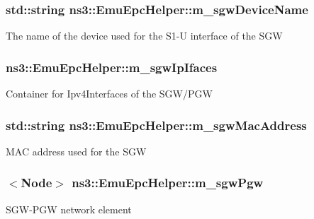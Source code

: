 \subsubsection[{\texorpdfstring{m\+\_\+sgw\+Device\+Name}{m_sgwDeviceName}}]{\setlength{\rightskip}{0pt plus 5cm}std\+::string ns3\+::\+Emu\+Epc\+Helper\+::m\+\_\+sgw\+Device\+Name\hspace{0.3cm}{\ttfamily [private]}}\hypertarget{classns3_1_1EmuEpcHelper_aaf7c6410b27ea82a8fabc136801bf0d4}{}\label{classns3_1_1EmuEpcHelper_aaf7c6410b27ea82a8fabc136801bf0d4}
The name of the device used for the S1-\/U interface of the S\+GW 
\subsubsection[{\texorpdfstring{m\+\_\+sgw\+Ip\+Ifaces}{m_sgwIpIfaces}}]{ ns3\+::\+Emu\+Epc\+Helper\+::m\+\_\+sgw\+Ip\+Ifaces\hspace{0.3cm}{\ttfamily [private]}}\hypertarget{classns3_1_1EmuEpcHelper_aec4d868be3d7593b66f0e87fc59055f1}{}\label{classns3_1_1EmuEpcHelper_aec4d868be3d7593b66f0e87fc59055f1}
Container for Ipv4\+Interfaces of the S\+G\+W/\+P\+GW 
\subsubsection[{\texorpdfstring{m\+\_\+sgw\+Mac\+Address}{m_sgwMacAddress}}]{\setlength{\rightskip}{0pt plus 5cm}std\+::string ns3\+::\+Emu\+Epc\+Helper\+::m\+\_\+sgw\+Mac\+Address\hspace{0.3cm}{\ttfamily [private]}}\hypertarget{classns3_1_1EmuEpcHelper_abb2f5dec50c8361cb99e11c9c688bf5c}{}\label{classns3_1_1EmuEpcHelper_abb2f5dec50c8361cb99e11c9c688bf5c}
M\+AC address used for the S\+GW 
\subsubsection[{\texorpdfstring{m\+\_\+sgw\+Pgw}{m_sgwPgw}}]{$<${\bf Node}$>$ ns3\+::\+Emu\+Epc\+Helper\+::m\+\_\+sgw\+Pgw\hspace{0.3cm}{\ttfamily [private]}}\hypertarget{classns3_1_1EmuEpcHelper_a5c68f673b82b8c80b5fb88ae986f8cea}{}\label{classns3_1_1EmuEpcHelper_a5c68f673b82b8c80b5fb88ae986f8cea}
S\+G\+W-\/\+P\+GW network element 
